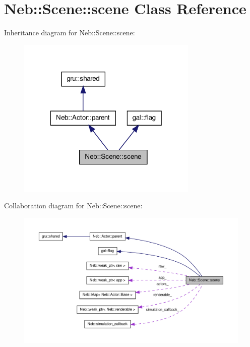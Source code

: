 \hypertarget{classNeb_1_1Scene_1_1scene}{\section{\-Neb\-:\-:\-Scene\-:\-:scene \-Class \-Reference}
\label{classNeb_1_1Scene_1_1scene}
}


\-Inheritance diagram for \-Neb\-:\-:\-Scene\-:\-:scene\-:\nopagebreak
\begin{figure}[H]
\begin{center}
\leavevmode
\includegraphics[width=244pt]{classNeb_1_1Scene_1_1scene__inherit__graph}
\end{center}
\end{figure}


\-Collaboration diagram for \-Neb\-:\-:\-Scene\-:\-:scene\-:\nopagebreak
\begin{figure}[H]
\begin{center}
\leavevmode
\includegraphics[width=350pt]{classNeb_1_1Scene_1_1scene__coll__graph}
\end{center}
\end{figure}

